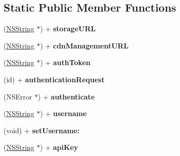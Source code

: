 \subsection*{\-Static \-Public \-Member \-Functions}
\begin{DoxyCompactItemize}
\item 
\hypertarget{interface_a_s_i_cloud_files_request_ad3081393068d6d38f5a94c279f21913a}{
(\hyperlink{class_n_s_string}{\-N\-S\-String} $\ast$) + {\bfseries storage\-U\-R\-L}}
\label{interface_a_s_i_cloud_files_request_ad3081393068d6d38f5a94c279f21913a}

\item 
\hypertarget{interface_a_s_i_cloud_files_request_a5905120ed76cc8f2e2f15161c5b5e34f}{
(\hyperlink{class_n_s_string}{\-N\-S\-String} $\ast$) + {\bfseries cdn\-Management\-U\-R\-L}}
\label{interface_a_s_i_cloud_files_request_a5905120ed76cc8f2e2f15161c5b5e34f}

\item 
\hypertarget{interface_a_s_i_cloud_files_request_a4d330b8a73775d1973596e86e3ab5269}{
(\hyperlink{class_n_s_string}{\-N\-S\-String} $\ast$) + {\bfseries auth\-Token}}
\label{interface_a_s_i_cloud_files_request_a4d330b8a73775d1973596e86e3ab5269}

\item 
\hypertarget{interface_a_s_i_cloud_files_request_a47b4d6dfe17aa488f36712b40c840cd4}{
(id) + {\bfseries authentication\-Request}}
\label{interface_a_s_i_cloud_files_request_a47b4d6dfe17aa488f36712b40c840cd4}

\item 
\hypertarget{interface_a_s_i_cloud_files_request_a86268aba6035a4828384abd98a80efb6}{
(\-N\-S\-Error $\ast$) + {\bfseries authenticate}}
\label{interface_a_s_i_cloud_files_request_a86268aba6035a4828384abd98a80efb6}

\item 
\hypertarget{interface_a_s_i_cloud_files_request_affdf3f94c3dc3f8adb9d7d0aa46e1455}{
(\hyperlink{class_n_s_string}{\-N\-S\-String} $\ast$) + {\bfseries username}}
\label{interface_a_s_i_cloud_files_request_affdf3f94c3dc3f8adb9d7d0aa46e1455}

\item 
\hypertarget{interface_a_s_i_cloud_files_request_a3490a956c1b184447e3866bbeac85ef4}{
(void) + {\bfseries set\-Username\-:}}
\label{interface_a_s_i_cloud_files_request_a3490a956c1b184447e3866bbeac85ef4}

\item 
\hypertarget{interface_a_s_i_cloud_files_request_a98af0e1df813c0a96810aba6487dd8ae}{
(\hyperlink{class_n_s_string}{\-N\-S\-String} $\ast$) + {\bfseries api\-Key}}
\label{interface_a_s_i_cloud_files_request_a98af0e1df813c0a96810aba6487dd8ae}


\end{DoxyCompactItemize}

